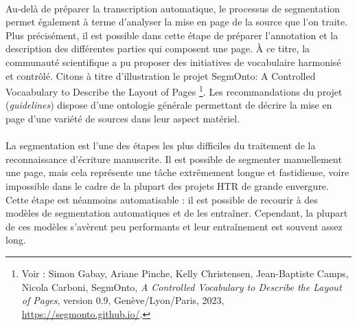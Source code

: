 \documentclass[a4paper,12pt,twoside]{book}
\begin{document}
\paragraph{}
Au-delà de préparer la transcription automatique, le processus de segmentation permet également à terme d’analyser la mise en page de la source que l’on traite. Plus précisément, il est possible dans cette étape de préparer l’annotation et la description des différentes parties qui composent une page. À ce titre, la communauté scientifique a pu proposer des initiatives de vocabulaire harmonisé et contrôlé. Citons à titre d'illustration le projet SegmOnto: A Controlled Vocaabulary to Describe the Layout of Pages \footnote{Voir : Simon Gabay, Ariane Pinche, Kelly Christensen, Jean-Baptiste Camps, Nicola Carboni, SegmOnto,\textit{ A Controlled Vocabulary to Describe the Layout of Pages}, version 0.9, Genève/Lyon/Paris, 2023, \url{https://segmonto.github.io/}.}. Les recommandations du projet (\textit{guidelines}) dispose d’une ontologie générale permettant de décrire la mise en page d’une variété de sources dans leur aspect matériel.  

\paragraph{}
La segmentation est l'une des étapes les plus difficiles du traitement de la reconnaissance d’écriture manuscrite. Il est possible de segmenter manuellement une page, mais cela représente une tâche extrêmement longue et fastidieuse, voire impossible dans le cadre de la plupart des projets HTR de grande envergure. Cette étape est néanmoins automatisable : il est possible de recourir à des modèles de segmentation automatiques et de les entraîner. Cependant, la plupart de ces modèles s’avèrent peu performants et leur entraînement est souvent assez long.
\end{document}

